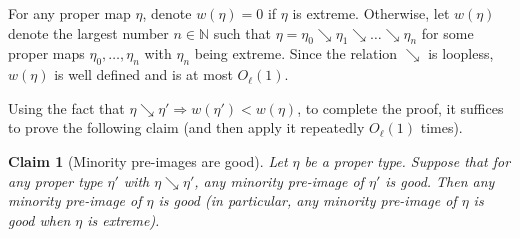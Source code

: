 \documentclass[11pt]{amsart}
\newtheorem{claim}[lemma]{Claim}
\theoremstyle{definition}
\newcommand{\N}{{\mathbb N}}
\newcommand{\1}{{\mathbf{1}}}
\begin{document}

 
 For any proper map $\eta$, denote $w(\eta)=0$ if $\eta$ is extreme. Otherwise, 
 let $w(\eta)$ denote the largest number $n\in\N$ such that $\eta=\eta_{0}\searrow \eta_{1}\searrow\dots\searrow\eta_{n}$ for some proper maps $\eta_{0},\dots,\eta_{n}$ with $\eta_{n}$ being extreme. Since the relation $\searrow$ is loopless, $w(\eta)$ is well defined and is at most $O_{\ell}(1)$.  
    
   Using the fact that $\eta\searrow\eta'\Rightarrow w(\eta')<w(\eta)$, 
   to complete the proof, it suffices to prove the following claim (and then apply it repeatedly $O_\ell(1)$ times).

\begin{claim}[Minority pre-images are good]\label{C: smoothing claim}
    Let $\eta$ be a proper type. Suppose that for any proper type $\eta'$ with %
   $\eta\searrow\eta'$, any minority pre-image of $\eta'$ is good. Then any minority pre-image of $\eta$ is good (in particular, any minority pre-image of $\eta$ is good when $\eta$ is extreme).
\end{claim}
\end{document}
